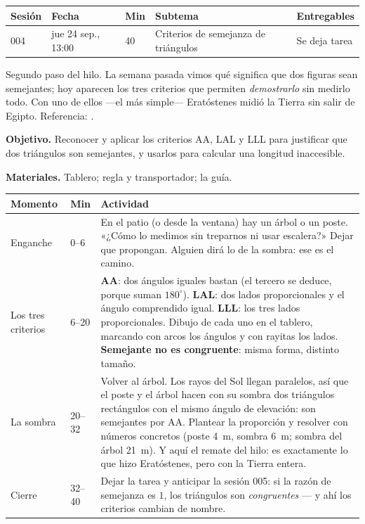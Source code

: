 \documentclass[11pt]{article}
\begin{document}
\encabezado*

\begin{center}
{\renewcommand{\arraystretch}{1.3}
\begin{tabularx}{\linewidth}{@{}l l l X l@{}}
  \toprule
  \textbf{Sesión} & \textbf{Fecha} & \textbf{Min} & \textbf{Subtema} & \textbf{Entregables}\\
  \midrule
  004 & jue 24 sep., 13:00 & 40 & Criterios de semejanza de triángulos & Se deja tarea\\
  \bottomrule
\end{tabularx}}
\end{center}

Segundo paso del hilo. La semana pasada vimos qué significa que dos figuras sean semejantes;
hoy aparecen los tres criterios que permiten \emph{demostrarlo} sin medirlo todo. Con uno de
ellos —el más simple— Eratóstenes midió la Tierra sin salir de Egipto.
Referencia: .


\textbf{Objetivo.} Reconocer y aplicar los criterios AA, LAL y LLL para justificar que dos
triángulos son semejantes, y usarlos para calcular una longitud inaccesible.

\textbf{Materiales.} Tablero; regla y transportador; la guía.

\begin{center}
{\renewcommand{\arraystretch}{1.3}
\begin{tabularx}{\linewidth}{@{}l l X@{}}
  \toprule
  \textbf{Momento} & \textbf{Min} & \textbf{Actividad}\\
  \midrule
  Enganche & 0--6 & En el patio (o desde la ventana) hay un árbol o un poste. «¿Cómo lo
    medimos sin treparnos ni usar escalera?» Dejar que propongan. Alguien dirá lo de la
    sombra: ese es el camino.\\
  Los tres criterios & 6--20 & \textbf{AA}: dos ángulos iguales bastan (el tercero se
    deduce, porque suman $180^\circ$). \textbf{LAL}: dos lados proporcionales y el ángulo
    comprendido igual. \textbf{LLL}: los tres lados proporcionales. Dibujo de cada uno en
    el tablero, marcando con arcos los ángulos y con rayitas los lados.
    \textbf{Semejante no es congruente}: misma forma, distinto tamaño.\\
  La sombra & 20--32 & Volver al árbol. Los rayos del Sol llegan paralelos, así que el
    poste y el árbol hacen con su sombra dos triángulos rectángulos con el mismo ángulo de
    elevación: son semejantes por AA. Plantear la proporción y resolver con números
    concretos (poste \qty{4}{m}, sombra \qty{6}{m}; sombra del árbol \qty{21}{m}).
    Y aquí el remate del hilo: es exactamente lo que hizo Eratóstenes, pero con la Tierra
    entera.\\
  Cierre & 32--40 & Dejar la tarea y anticipar la sesión 005: si la razón de semejanza es
    $1$, los triángulos son \emph{congruentes} — y ahí los criterios cambian de nombre.\\
  \bottomrule
\end{tabularx}}
\end{center}
\end{document}
